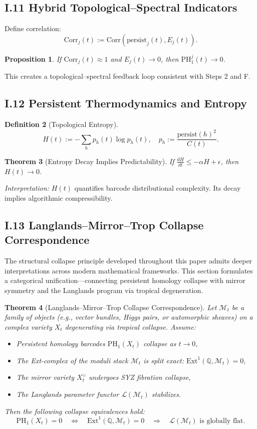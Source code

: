 \documentclass[11pt]{article}
\newtheorem{theorem}{Theorem}[section]
\newtheorem{proposition}[theorem]{Proposition}
\theoremstyle{definition}
\newtheorem{definition}[theorem]{Definition}
\begin{document}
\subsection*{I.11 Hybrid Topological--Spectral Indicators}
Define correlation:
\[
\mathrm{Corr}_j(t) := \mathrm{Corr}(\mathrm{persist}_j(t), E_j(t)).
\]
\begin{proposition}
If $\mathrm{Corr}_j(t) \approx 1$ and $E_j(t) \to 0$, then $\mathrm{PH}_1^j(t) \to 0$.
\end{proposition}
This creates a topological–spectral feedback loop consistent with Steps 2 and F.

\subsection*{I.12 Persistent Thermodynamics and Entropy}
\begin{definition}[Topological Entropy]
\[
H(t) := - \sum_h p_h(t) \log p_h(t), \quad p_h := \frac{\mathrm{persist}(h)^2}{C(t)}.
\]
\end{definition}
\begin{theorem}[Entropy Decay Implies Predictability]
If $\frac{dH}{dt} \leq -\alpha H + \epsilon$, then $H(t) \to 0$.
\end{theorem}
\textit{Interpretation:} $H(t)$ quantifies barcode distributional complexity. Its decay implies algorithmic compressibility.

\subsection*{I.13 Langlands–Mirror–Trop Collapse Correspondence}

The structural collapse principle developed throughout this paper admits deeper interpretations across modern mathematical frameworks.  
This section formulates a categorical unification—connecting persistent homology collapse with mirror symmetry and the Langlands program via tropical degeneration.

\begin{theorem}[Langlands–Mirror–Trop Collapse Correspondence]
Let $\mathcal{M}_t$ be a family of objects (e.g., vector bundles, Higgs pairs, or automorphic sheaves) on a complex variety $X_t$ degenerating via tropical collapse.  
Assume:
\begin{itemize}
  \item Persistent homology barcodes $\mathrm{PH}_1(X_t)$ collapse as $t \to 0$,
  \item The Ext-complex of the moduli stack $\mathcal{M}_t$ is split exact: $\mathrm{Ext}^1(\mathbb{Q}, \mathcal{M}_t) = 0$,
  \item The mirror variety $X_t^\vee$ undergoes SYZ fibration collapse,
  \item The Langlands parameter functor $\mathcal{L}(\mathcal{M}_t)$ stabilizes.
\end{itemize}
Then the following collapse equivalences hold:
\[
\mathrm{PH}_1(X_t) = 0 \quad \Longleftrightarrow \quad \mathrm{Ext}^1(\mathbb{Q}, \mathcal{M}_t) = 0 \quad \Longrightarrow \quad \mathcal{L}(\mathcal{M}_t) \text{ is globally flat}.
\]
\end{theorem}
\end{document}
